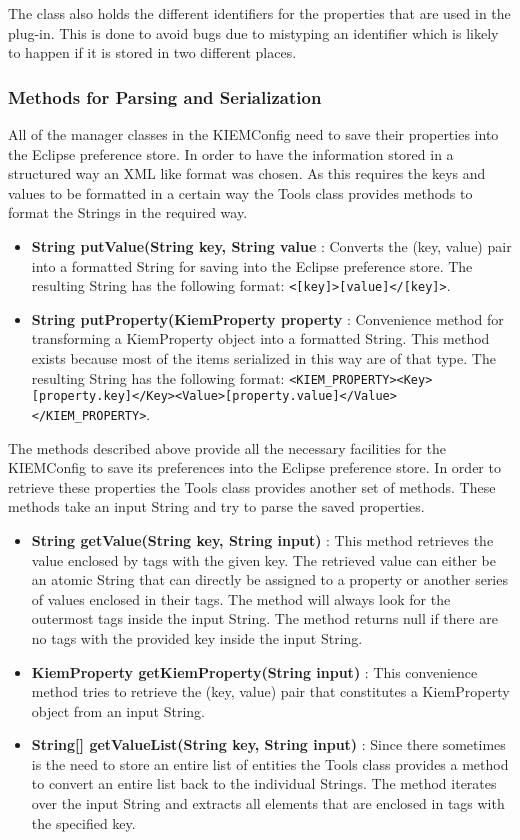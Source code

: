 The class also holds the different identifiers for the properties that are used in the plug-in. This is done
to avoid bugs due to mistyping an identifier which is likely to happen if it is stored in two different places.

\subsubsection{Methods for Parsing and Serialization}
\label{section:ToolsMethodsParsing}
All of the manager classes in the \ac{KIEMConfig} need to save their properties into the Eclipse preference store.
In order to have the information stored in a structured way an \ac{XML} like format was chosen. As this requires the keys and values
to be formatted in a certain way the Tools class provides methods to format the Strings in the required way.
\lstset{
backgroundcolor=,
}
\begin{itemize}
 \item \textbf{String putValue(String key, String value} : Converts the (key, value) pair into a formatted String for saving
into the Eclipse preference store. The resulting String has the following format: 
\lstinline|<[key]>[value]</[key]>|.
 \item \textbf{String putProperty(KiemProperty property} : Convenience method for transforming a KiemProperty object into a
formatted String. This method exists because most of the items serialized in this way are of that type. The resulting String
has the following format: \lstinline|<KIEM_PROPERTY><Key>[property.key]</Key><Value>[property.value]</Value></KIEM_PROPERTY>|.
\end{itemize}

The methods described above provide all the necessary facilities for the \ac{KIEMConfig} to save its preferences
into the Eclipse preference store. In order to retrieve these properties the Tools class provides another set of
methods. These methods take an input String and try to parse the saved properties.
\begin{itemize}
 \item \textbf{String getValue(String key, String input)} : This method retrieves the value enclosed by tags with
the given key. The retrieved value can either be an atomic String that can directly be assigned to a property or
another series of values enclosed in their tags. The method will always look for the outermost tags inside the
input String. The method returns null if there are no tags with the provided key inside the input String.
 \item \textbf{KiemProperty getKiemProperty(String input)} : This convenience method tries to retrieve the 
(key, value) pair that constitutes a KiemProperty object from an input String.
 \item \textbf{String[] getValueList(String key, String input)} : Since there sometimes is the need to store an entire
list of entities the Tools class provides a method to convert an entire list back to the individual Strings.
The method iterates over the input String and extracts all elements that are enclosed in tags with the specified key.
\end{itemize}


